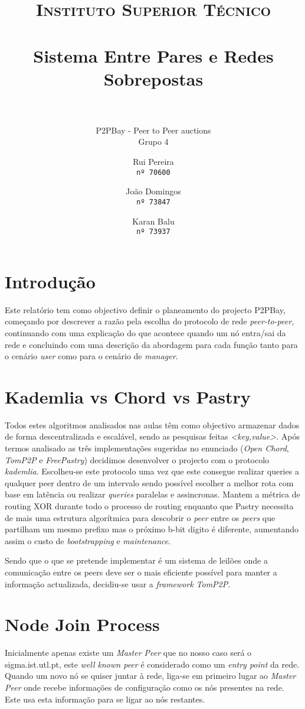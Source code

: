 \documentclass[paper=a4, fontsize=11pt]{scrartcl}
\title{
    \usefont{OT1}{bch}{b}{n}
    \normalfont \normalsize \textsc{Instituto Superior Técnico} \\ [25pt]
    \horrule{0.5pt} \\[0.4cm]
    \huge Sistema Entre Pares e Redes Sobrepostas \\
    \horrule{2pt} \\[0.5cm]
}
\subtitle{P2PBay - Peer to Peer auctions\\\vspace{5mm}\small Grupo 4}
\author{
  \normalsize Rui Pereira\\
  \normalsize \texttt{nº 70600}
  \and
  \normalsize João Domingos\\
  \normalsize \texttt{nº 73847}
  \and
  \normalsize Karan Balu\\
  \normalsize \texttt{nº 73937}
}
\date{}
\numberwithin{equation}{section}    %
\numberwithin{figure}{section}      %
\numberwithin{table}{section}       %
\begin{document}
\maketitle
\section{Introdução}
Este relatório tem como objectivo definir o planeamento do projecto P2PBay, começando por descrever a razão pela escolha do protocolo de rede \textit{peer-to-peer}, continuando com uma explicação do que acontece quando um nó entra/sai da rede e concluindo com uma descrição da abordagem para cada função tanto para o cenário \textit{user} como para o cenário de \textit{manager}.




\section{Kademlia vs Chord vs Pastry}
Todos estes algoritmos analisados nas aulas têm como objectivo armazenar dados de forma descentralizada e escalável, sendo as pesquisas feitas \textit{<key,value>}. Após termos analisado as três implementações sugeridas no enunciado (\textit{Open Chord}, \textit{TomP2P} e \textit{FreePastry}) decidimos desenvolver o projecto com o protocolo \textit{kademlia}. Escolheu-se este protocolo uma vez que este consegue realizar queries a qualquer peer dentro de um intervalo sendo possível escolher a melhor rota com base em latência ou realizar \textit{queries} paralelas e assincronas.  Mantem a métrica de routing XOR durante todo o processo de routing enquanto que Pastry necessita de mais uma estrutura algorítmica para descobrir o \textit{peer} entre os \textit{peers} que partilham um mesmo prefixo mas o próximo b-bit digito é diferente, aumentando assim o custo de \textit{bootstrapping} e \textit{maintenance}.\par Sendo que o que se pretende implementar é um sistema de leilões onde a comunicação entre os peers deve ser o mais eficiente possível para manter a informação actualizada, decidiu-se usar a \textit{framework} \textit{TomP2P}. 



\section{Node Join Process}
Inicialmente apenas existe um \textit{Master Peer} que no nosso caso será o sigma.ist.utl.pt, este \textit{well known peer} é considerado como um  \textit{entry point} da rede. Quando um novo nó se quiser juntar à rede, liga-se em primeiro lugar ao \textit{Master Peer} onde recebe informações de configuração como os nós presentes na rede. Este usa esta informação para se ligar ao nós restantes.
\end{document}
